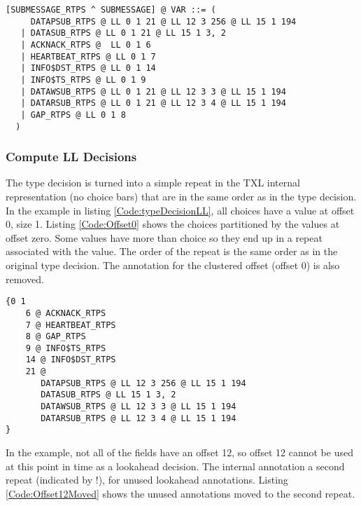\documentclass[12pt,oneside,letterpaper]{article}
\begin{document}
\begin{lstlisting}[language=SCL2,style=mystyle,frame=none,float,
caption=Type Decision Annotation,label=Code:typeDecisionLL, xleftmargin=3.5ex]
 [SUBMESSAGE_RTPS ^ SUBMESSAGE] @ VAR ::= (
     DATAPSUB_RTPS @ LL 0 1 21 @ LL 12 3 256 @ LL 15 1 194
   | DATASUB_RTPS @ LL 0 1 21 @ LL 15 1 3, 2
   | ACKNACK_RTPS @  LL 0 1 6
   | HEARTBEAT_RTPS @ LL 0 1 7
   | INFO$DST_RTPS @ LL 0 1 14 
   | INFO$TS_RTPS @ LL 0 1 9
   | DATAWSUB_RTPS @ LL 0 1 21 @ LL 12 3 3 @ LL 15 1 194
   | DATARSUB_RTPS @ LL 0 1 21 @ LL 12 3 4 @ LL 15 1 194
   | GAP_RTPS @ LL 0 1 8
  )
\end{lstlisting}

\subsubsection{Compute LL Decisions}

The type decision is turned into a simple repeat in the TXL internal representation (no choice bars) that are in the same order as in the type decision. In the example in listing \ref{Code:typeDecisionLL}, all choices have a value at offset 0, size 1. Listing \ref{Code:Offset0} shows the choices partitioned by the values at offset zero. Some values have more than choice so they end up in a repeat associated with the value. The order of the repeat is the same order as in the original type decision. The annotation for the clustered offset  (offset 0) is also removed.

\begin{lstlisting}[language=SCL2,style=mystyle,frame=none,float,
caption=Offset Zero Partition,label=Code:Offset0, xleftmargin=3.5ex]
{0 1
    6 @ ACKNACK_RTPS
    7 @ HEARTBEAT_RTPS
    8 @ GAP_RTPS
    9 @ INFO$TS_RTPS
    14 @ INFO$DST_RTPS
    21 @
       DATAPSUB_RTPS @ LL 12 3 256 @ LL 15 1 194 
       DATASUB_RTPS @ LL 15 1 3, 2 
       DATAWSUB_RTPS @ LL 12 3 3 @ LL 15 1 194
       DATARSUB_RTPS @ LL 12 3 4 @ LL 15 1 194
}
\end{lstlisting}

In the example, not all of the fields have an offset 12, so offset 12 cannot be used at this point in time as a lookahead decision. The internal annotation a second repeat (indicated by !), for unused lookahead annotations. Listing \ref{Code:Offset12Moved} shows the unused annotations moved to the second repeat.
\end{document}
